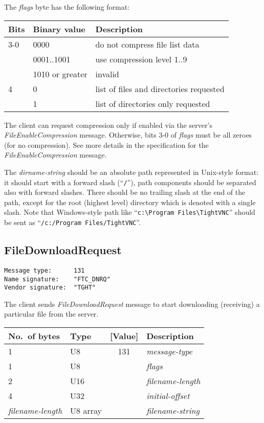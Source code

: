 \documentclass[a4paper]{article}
\newcommand{\typestr}[1]{\textit{#1}}
\begin{document}
The \typestr{flags} byte has the following format:

\begin{tabular}{l|l|l}
\hline
Bits & Binary value   & Description \\ \hline
3-0 & 0000            & do not compress file list data \\
    & 0001..1001      & use compression level 1..9 \\
    & 1010 or greater & invalid \\
\hline
4   & 0   & list of files and directories requested \\
    & 1   & list of directories only requested \\
\hline
\end{tabular}

The client can request compression only if enabled via the server's
\typestr{FileEnableCompression} message. Otherwise, bits 3-0 of
\typestr{flags} must be all zeroes (for no compression). See more
details in the specification for the \typestr{FileEnableCompression}
message.


The \typestr{dirname-string} should be an absolute path represented in
Unix-style format: it should start with a forward slash
(``\verb|/|''), path components should be separated also with forward
slashes. There should be no trailing slash at the end of the path,
except for the root (highest level) directory which is denoted with a
single slash. Note that Windows-style path like
``\verb|c:\Program Files\TightVNC|'' should be sent as
``\verb|/c:/Program Files/TightVNC|''.

\newpage
\subsection{FileDownloadRequest}
\begin{verbatim}
Message type:      131
Name signature:    "FTC_DNRQ"
Vendor signature:  "TGHT"
\end{verbatim}

The client sends \typestr{FileDownloadRequest} message to start
downloading (receiving) a particular file from the server.

\begin{tabular}{l|lc|l} \hline
No.\ of bytes & Type & [Value] & Description \\ \hline
1 & U8  & 131 & \typestr{message-type} \\
1 & U8  &     & \typestr{flags} \\
2 & U16 &     & \typestr{filename-length} \\
4 & U32 &     & \typestr{initial-offset} \\
\typestr{filename-length} & U8 array & & \typestr{filename-string} \\
\hline\end{tabular}
\end{document}
